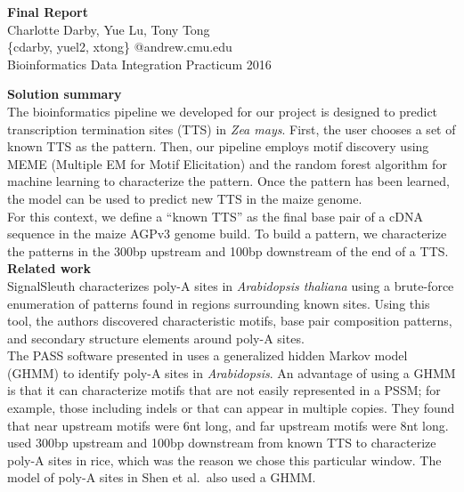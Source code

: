 \documentclass[12pt,letterpaper]{report}
\begin{document}
\begin{center}
{\huge \textbf{Final Report}}\\
Charlotte Darby, Yue Lu, Tony Tong\\
\{cdarby, yuel2, xtong\} @andrew.cmu.edu\\
Bioinformatics Data Integration Practicum 2016\\
\end{center}

{\Large\textbf{Solution summary}}\\

The bioinformatics pipeline we developed for our project is designed to predict transcription termination sites (TTS) in \textsl{Zea mays}. First, the user chooses a set of known TTS as the pattern. Then, our pipeline employs motif discovery using MEME (Multiple EM for Motif Elicitation) \cite{meme} and the random forest algorithm for machine learning \cite{rf} to characterize the pattern. Once the pattern has been learned, the model can be used to predict new TTS in the maize genome.\\

\indent For this context, we define a ``known TTS'' as the final base pair of a cDNA sequence in the maize AGPv3 genome build. To build a pattern, we characterize the patterns in the 300bp upstream and 100bp downstream of the end of a TTS. \\

{\Large\textbf{Related work}}\\

\indent SignalSleuth \citep{loke05} characterizes poly-A sites in \textsl{Arabidopsis thaliana} using a brute-force enumeration of patterns found in regions surrounding known sites. Using this tool, the authors discovered characteristic motifs, base pair composition patterns, and secondary structure elements around poly-A sites.\\

\indent The PASS software presented in \citep{ji07} uses a generalized hidden Markov model (GHMM) to identify poly-A sites in \textsl{Arabidopsis}. An advantage of using a GHMM is that it can characterize motifs that are not easily represented in a PSSM; for example, those including indels or that can appear in multiple copies. They found that near upstream motifs were 6nt long, and far upstream motifs were 8nt long.\\

\indent \citet{shen08} used 300bp upstream and 100bp downstream from known TTS to characterize poly-A sites in rice, which was the reason we chose this particular window. The model of poly-A sites in Shen et al.~also used a GHMM.\\
\end{document}
